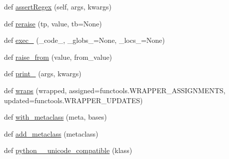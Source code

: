 \begin{DoxyCompactItemize}
def \hyperlink{namespacesix_a772ce739f442ee3640abf1c0bf091749}{assert\+Regex} (self, args, kwargs)
\item 
def \hyperlink{namespacesix_ae8a8e80e2dabc3c2bc2d8a582cfcc43d}{reraise} (tp, value, tb=None)
\item 
def \hyperlink{namespacesix_a5151099b4e703601f34a658d42c14100}{exec\+\_\+} (\+\_\+code\+\_\+, \+\_\+globs\+\_\+=None, \+\_\+locs\+\_\+=None)
\item 
def \hyperlink{namespacesix_a5321131a67ed38a6ffef95beebc1c334}{raise\+\_\+from} (value, from\+\_\+value)
\item 
def \hyperlink{namespacesix_ad04fa7d5b6867bc3d14c6cac60116ced}{print\+\_\+} (args, kwargs)
\item 
def \hyperlink{namespacesix_ac61e4b217e98112323ac2335dc9e2e99}{wraps} (wrapped, assigned=functools.\+W\+R\+A\+P\+P\+E\+R\+\_\+\+A\+S\+S\+I\+G\+N\+M\+E\+N\+TS, updated=functools.\+W\+R\+A\+P\+P\+E\+R\+\_\+\+U\+P\+D\+A\+T\+ES)
\item 
def \hyperlink{namespacesix_af599400254a842b0a0fc5dab5bcbe8a4}{with\+\_\+metaclass} (meta, bases)
\item 
def \hyperlink{namespacesix_ac92c20d6dc6979883b76fc6cf43f44b8}{add\+\_\+metaclass} (metaclass)
\item 
def \hyperlink{namespacesix_a341d28e4b5838a614702f1b01b9ce39d}{python\+\_\+\_\+unicode\+\_\+compatible} (klass)
\end{DoxyCompactItemize}
